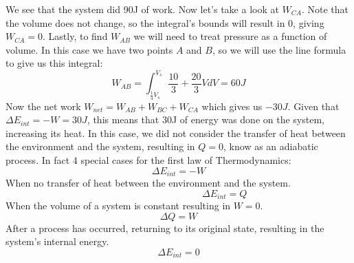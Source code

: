 \documentclass[11pt]{article}
\begin{document}
    \vspace{2em}
\noindent We see that the system did 90J of work. Now let's take a look at $W_{CA}$.
    Note that the volume does not change, so the integral's bounds will result in 0,
    giving $W_{CA} = 0$. Lastly, to find $W_{AB}$ we will need to treat pressure as a
    function of volume. In this case we have two points $A$ and $B$,
    so we will use the line formula to give us this integral:
    \begin{equation}
        W_{AB} = \int_{\frac{1}{4}V_s}^{V_s} \frac{10}{3} + \frac{20}{3}V dV
        = 60 J
    \end{equation}
    Now the net work $W_{net} = W_{AB} + W_{BC} + W_{CA}$ which gives us $-30J.$
    Given that $\Delta E_{int} = - W = 30J$,
    this means that 30J of energy was done on the system, increasing its heat.
    In this case, we did not consider the transfer of heat between the environment and the system,
    resulting in $Q = 0$, know as an adiabatic process.
    In fact 4 special cases for the first law of Thermodynamics:
    \begin{equation}
        \Delta E_{int} = -W \tag{adiabatic process}
    \end{equation}
    When no transfer of heat between the environment and the system.
    \begin{equation}
       \hspace{4cm} \Delta E_{int} = Q\tag{Constant-volume process}
    \end{equation}
    When the volume of a system is constant resulting in $W = 0$.
    \begin{equation}
        \Delta Q = W\tag{Cyclical process}
    \end{equation}
    After a process has occurred, returning to its original state,
    resulting in the system's internal energy.
    \begin{equation}
        \Delta E_{int} = 0 \tag{Free expansions}
    \end{equation}
\end{document}
